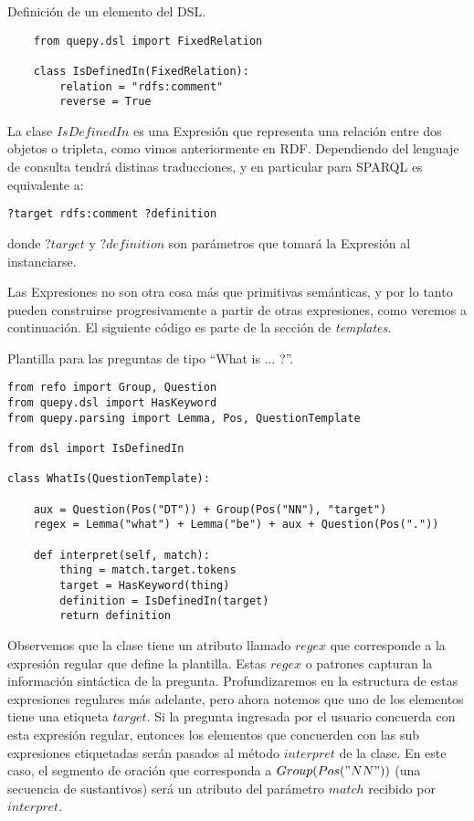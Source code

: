 \begin{example}Definición de un elemento del DSL.
    \begin{lstlisting}
    from quepy.dsl import FixedRelation

    class IsDefinedIn(FixedRelation):
        relation = "rdfs:comment"
        reverse = True
    \end{lstlisting}
\end{example}

La clase $IsDefinedIn$ es una Expresión que representa una relación entre dos objetos o tripleta, como vimos anteriormente en RDF. Dependiendo del lenguaje de consulta tendrá distinas traducciones, y en particular para SPARQL es equivalente a:

\begin{lstlisting}
?target rdfs:comment ?definition
\end{lstlisting}

donde $?target$ y $?definition$ son parámetros que tomará la Expresión al instanciarse.

Las Expresiones no son otra cosa más que primitivas semánticas, y por lo tanto pueden construirse progresivamente a partir de otras expresiones, como veremos a continuación. El siguiente código es parte de la sección de \textit{templates}.

\begin{example}\label{plantilla-quepy} Plantilla para las preguntas de tipo ``What is ... ?''.
\begin{lstlisting}
from refo import Group, Question
from quepy.dsl import HasKeyword
from quepy.parsing import Lemma, Pos, QuestionTemplate

from dsl import IsDefinedIn

class WhatIs(QuestionTemplate):

    aux = Question(Pos("DT")) + Group(Pos("NN"), "target")
    regex = Lemma("what") + Lemma("be") + aux + Question(Pos("."))

    def interpret(self, match):
        thing = match.target.tokens
        target = HasKeyword(thing)
        definition = IsDefinedIn(target)
        return definition
\end{lstlisting}
\end{example}

Observemos que la clase tiene un atributo llamado $regex$ que corresponde a la expresión regular que define la plantilla. Estas $regex$ o patrones capturan la información sintáctica de la pregunta. Profundizaremos en la estructura de estas expresiones regulares más adelante, pero ahora notemos que uno de los elementos tiene una etiqueta $target$. Si la pregunta ingresada por el usuario concuerda con esta expresión regular, entonces los elementos que concuerden con las sub expresiones etiquetadas serán pasados al método $interpret$ de la clase. En este caso, el segmento de oración que corresponda a $Group(Pos("NN"))$ (una secuencia de sustantivos) será un atributo del parámetro $match$ recibido por $interpret$.

